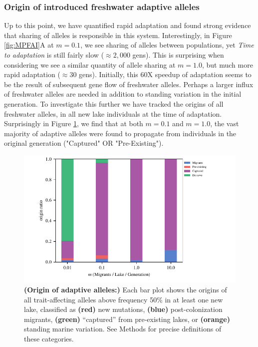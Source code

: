 \documentclass{article}
\begin{document}
\subsubsection*{Origin of introduced freshwater adaptive alleles}
Up to this point, we have quantified rapid adaptation and found strong evidence that sharing of alleles is responsible in this system.
Interestingly, in Figure \ref{fig:MPFAI}A at $m = 0.1$, we see sharing of alleles between populations,
yet \emph{Time to adaptation} is still fairly slow ($\approx 2,000$ gens).
This is surprising when considering we see a similar quantity of allele sharing at  $m = 1.0$, 
but much more rapid adaptation ($\approx 30$ gens). 
Initially, this 60X speedup of adaptation seems to be the result of subsequent gene flow of freshwater alleles. 
Perhaps a larger influx of freshwater alleles are needed in addition to standing variation in the initial generation.
To investigate this further we have tracked the origins of all freshwater alleles, in all new lake individuals at the time of adaptation. 
Surprisingly in Figure \ref{fig:Origin}, we find that at both $m = 0.1$ and $m = 1.0$,
the vast majority of adaptive alleles were found to propagate from individuals in the original generation ("Captured" OR "Pre-Existing").

\begin{figure}
	\begin{center}
  		\includegraphics[width=0.7\linewidth]{Final_Plots/Allele_Origin.pdf}
  		\caption{ 
        \textbf{(Origin of adaptive alleles:)}
        Each bar plot shows the origins
		of all trait-affecting alleles above frequency 50\% in at least one new lake,
        classified as
		\textbf{(red)} new mutations,
		\textbf{(blue)} post-colonization migrants,
		\textbf{(green)} ``captured'' from pre-existing lakes, or
		\textbf{(orange)} standing marine variation.
        See Methods for precise definitions of these categories.
		}
  		\label{fig:Origin}
	\end{center}
\end{figure}
\end{document}
